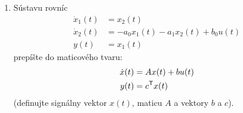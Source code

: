 \documentclass[a4paper, 10pt, ]{article}
\begin{document}
\begin{enumerate}[leftmargin=0pt, labelsep=3mm, itemsep=0pt]
    \item Sústavu rovníc
    \begin{align*}
        \dot x_1(t) &= x_2(t) \\
        \dot x_2(t) &= - a_0 x_1(t) - a_1 x_2(t) + b_0 u(t) \\
        y(t) &= x_1(t)
    \end{align*}
    prepíšte do maticového tvaru:
    \begin{align*}
        \dot x(t) &= Ax(t) + bu(t) \\
        y(t) &= c^{\mathsf{T}} x(t)
    \end{align*}
    (definujte signálny vektor $x(t)$, maticu $A$ a vektory $b$ a $c$).

\end{enumerate}
\end{document}
